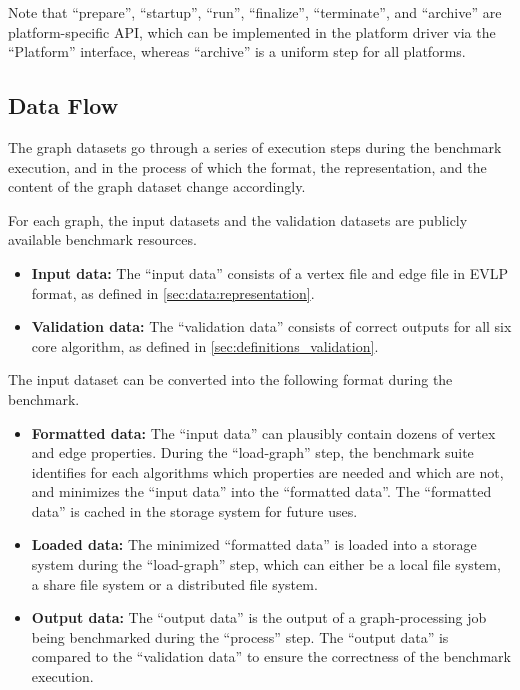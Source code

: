 Note that ``prepare'', ``startup'', ``run'', ``finalize'', ``terminate'', and ``archive'' are platform-specific API, which can be implemented in the platform driver via the ``Platform'' interface, whereas ``archive'' is a uniform step for all platforms.  


\subsection{Data Flow}
\label{sec:process:execution:data_flow}
The graph datasets go through a series of execution steps during the benchmark execution, and in the process of which the format, the representation, and the content of the graph dataset change accordingly.

For each graph, the input datasets and the validation datasets are publicly available benchmark resources.

\begin{itemize} 
    \item \textbf{Input data:} The ``input data'' consists of a vertex file and edge file in EVLP format, as defined in \autoref{sec:data:representation}.
    \item \textbf{Validation data:} The ``validation data'' consists of correct outputs for all six core algorithm, as defined in \autoref{sec:definitions_validation}.
\end{itemize}

The input dataset can be converted into the following format during the benchmark.

\begin{itemize}
    \item \textbf{Formatted data:} The ``input data'' can plausibly contain dozens of vertex and edge properties. During the ``load-graph'' step, the benchmark suite identifies for each algorithms which properties are needed and which are not, and minimizes the ``input data'' into the ``formatted data''. The ``formatted data'' is cached in the storage system for future uses. 
    \item \textbf{Loaded data:} The minimized ``formatted data'' is loaded into a storage system during the ``load-graph'' step, which can either be a local file system, a share file system or a distributed file system.
    \item \textbf{Output data:} The ``output data'' is the output of a graph-processing job being benchmarked during the ``process'' step. The ``output data'' is compared to the ``validation data'' to ensure the correctness of the benchmark execution.
\end{itemize}



